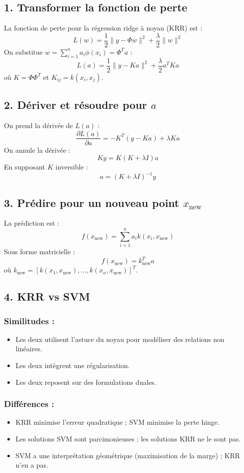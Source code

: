 \documentclass[a4paper,portrait]{article}
\begin{document}
\begin{multicols}{2}
\subsection*{1. Transformer la fonction de perte}
La fonction de perte pour la régression ridge à noyau (KRR) est :
\[
L(w) = \frac{1}{2} \| y - \Phi w \|^2 + \frac{\lambda}{2} \| w \|^2
\]
On substitue \( w = \sum_{i=1}^{n} a_i \phi(x_i) = \Phi^T a \) :
\[
L(a) = \frac{1}{2} \| y - K a \|^2 + \frac{\lambda}{2} a^T K a
\]
où \( K = \Phi \Phi^T \) et \( K_{ij} = k(x_i, x_j) \).

\subsection*{2. Dériver et résoudre pour \( a \)}
On prend la dérivée de \( L(a) \) :
\[
\frac{\partial L(a)}{\partial a} = -K^T (y - K a) + \lambda K a
\]
On annule la dérivée :
\[
K y = K (K + \lambda I) a
\]
En supposant \( K \) inversible :
\[
a = (K + \lambda I)^{-1} y
\]

\subsection*{3. Prédire pour un nouveau point \( x_{\text{new}} \)}
La prédiction est :
\[
f(x_{\text{new}}) = \sum_{i=1}^{n} a_i k(x_i, x_{\text{new}})
\]
Sous forme matricielle :
\[
f(x_{\text{new}}) = k_{\text{new}}^T a
\]
où \( k_{\text{new}} = [k(x_1, x_{\text{new}}), \dots, k(x_n, x_{\text{new}})]^T \).

\subsection*{4. KRR vs SVM}
\subsubsection*{Similitudes :}
\begin{itemize}
    \item Les deux utilisent l'astuce du noyau pour modéliser des relations non linéaires.
    \item Les deux intègrent une régularisation.
    \item Les deux reposent sur des formulations duales.
\end{itemize}

\subsubsection*{Différences :}
\begin{itemize}
    \item KRR minimise l'erreur quadratique ; SVM minimise la perte hinge.
    \item Les solutions SVM sont parcimonieuses ; les solutions KRR ne le sont pas.
    \item SVM a une interprétation géométrique (maximisation de la marge) ; KRR n'en a pas.
\end{itemize}



\end{multicols}
\end{document}
